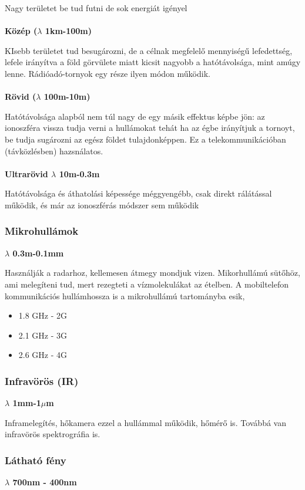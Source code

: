 \documentclass{article}
\begin{document}
Nagy területet be tud futni de sok energiát igényel \\  \\
\textbf{Közép ($\lambda$ 1km-100m)}

KIsebb területet tud besugározni, de a célnak megfelelő mennyiségű lefedettség, lefele irányítva a föld görvülete miatt kicsit nagyobb a hatótávolsága, mint amúgy lenne. Rádióadó-tornyok egy része ilyen módon működik.  \\ \\
\textbf{Rövid ($\lambda$ 100m-10m)}

Hatótávolsága alapból nem túl nagy de egy másik effektus képbe jön: az ionoszféra vissza tudja verni a hullámokat tehát ha az égbe irányítjuk a tornoyt, be tudja sugározni az egész földet tulajdonképpen. Ez a telekommunikációban (távközlésben) hazsnálatos. \\ \\
\textbf{Ultrarövid $\lambda$ 10m-0.3m}

Hatótávolsága és áthatolási képessége méggyengébb, csak direkt rálátással működik, és már az ionoszférás módszer sem működik 

\subsubsection{Mikrohullámok}
\textbf{$\lambda$ 0.3m-0.1mm}

Használják a radarhoz, kellemesen átmegy mondjuk vizen. Mikorhullámú sütőhöz, ami melegíteni tud, mert rezegteti a vízmolekulákat az ételben. A mobiltelefon kommunikációs hullámhossza is a mikrohullámú tartományba esik, 
\begin{itemize}
\item 1.8 GHz - 2G 
\item 2.1 GHz - 3G 
\item 2.6 GHz - 4G
\end{itemize}

\subsubsection{Infravörös (IR)}
\textbf{$\lambda$ 1mm-1$\mu$m}

Inframelegítés, hőkamera ezzel a hullámmal működik, hőmérő is. Továbbá van infravörös spektrográfia is. 
\subsubsection{Látható fény}
\textbf{$\lambda$ 700nm - 400nm}
\end{document}
